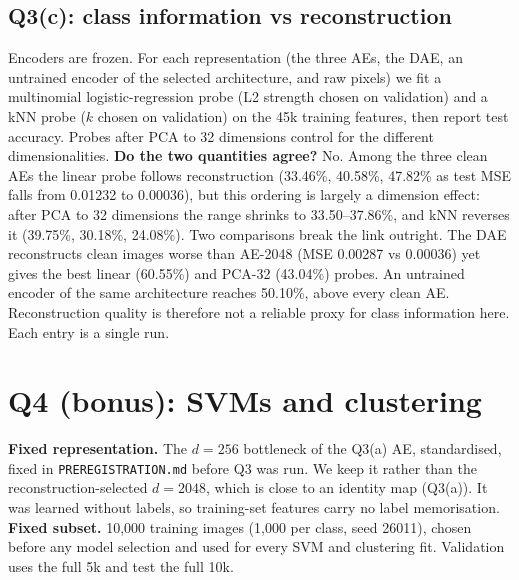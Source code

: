 \documentclass[10pt,twocolumn,letterpaper]{article}
\newcommand{\todo}[1]{\textcolor{red}{[TODO: #1]}}
\newcommand{\tab}[1]{\IfFileExists{tables/#1.tex}{}{\todo{run make\_tables.py: #1}}}
\begin{document}
\subsection{Q3(c): class information vs reconstruction}
Encoders are frozen. For each representation (the three AEs, the DAE, an untrained encoder of the selected
architecture, and raw pixels) we fit a multinomial logistic-regression probe (L2 strength chosen on
validation) and a kNN probe ($k$ chosen on validation) on the 45k training features, then report test
accuracy. Probes after PCA to 32 dimensions control for the different dimensionalities.
\tab{tab_q3c}
\textbf{Do the two quantities agree?} No. Among the three clean AEs the linear probe follows reconstruction (33.46\%, 40.58\%, 47.82\% as test MSE falls from 0.01232 to 0.00036), but this ordering is largely a dimension effect: after PCA to 32 dimensions the range shrinks to 33.50--37.86\%, and kNN reverses it (39.75\%, 30.18\%, 24.08\%). Two comparisons break the link outright. The DAE reconstructs clean images worse than AE-2048 (MSE 0.00287 vs 0.00036) yet gives the best linear (60.55\%) and PCA-32 (43.04\%) probes. An untrained encoder of the same architecture reaches 50.10\%, above every clean AE. Reconstruction quality is therefore not a reliable proxy for class information here. Each entry is a single run.

\section{Q4 (bonus): SVMs and clustering}
\textbf{Fixed representation.} The $d=256$ bottleneck of the Q3(a) AE, standardised, fixed in \texttt{PREREGISTRATION.md} before Q3 was run. We keep it rather than the reconstruction-selected $d=2048$, which is close to an identity map (Q3(a)). It was learned
without labels, so training-set features carry no label memorisation. \textbf{Fixed subset.} 10,000
training images (1,000 per class, seed 26011), chosen before any model selection and used for every SVM
and clustering fit. Validation uses the full 5k and test the full 10k.
\end{document}
